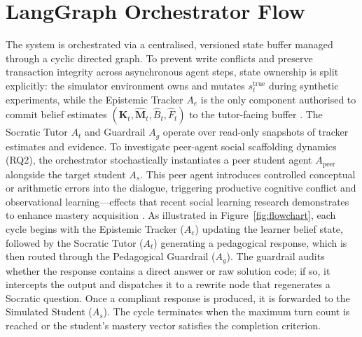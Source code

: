 \documentclass[11pt,a4paper]{report}
\begin{document}
\section{LangGraph Orchestrator Flow}
The system is orchestrated via a centralised, versioned state buffer managed through a cyclic directed graph. To prevent write conflicts and preserve transaction integrity across asynchronous agent steps, state ownership is split explicitly: the simulator environment owns and mutates $s_t^{\text{true}}$ during synthetic experiments, while the Epistemic Tracker $A_e$ is the only component authorised to commit belief estimates $(\hat{\mathbf{K}}_t,\hat{\mathbf{M}}_t,\hat{B}_t,\hat{F}_t)$ to the tutor-facing buffer \cite{intellicode2025,elhaimeur2026itas}. The Socratic Tutor $A_t$ and Guardrail $A_g$ operate over read-only snapshots of tracker estimates and evidence. To investigate peer-agent social scaffolding dynamics (RQ2), the orchestrator stochastically instantiates a peer student agent $A_{\text{peer}}$ alongside the target student $A_s$. This peer agent introduces controlled conceptual or arithmetic errors into the dialogue, triggering productive cognitive conflict and observational learning---effects that recent social learning research demonstrates to enhance mastery acquisition \cite{kumar2026beyond}. As illustrated in Figure~\ref{fig:flowchart}, each cycle begins with the Epistemic Tracker ($A_e$) updating the learner belief state, followed by the Socratic Tutor ($A_t$) generating a pedagogical response, which is then routed through the Pedagogical Guardrail ($A_g$). The guardrail audits whether the response contains a direct answer or raw solution code; if so, it intercepts the output and dispatches it to a rewrite node that regenerates a Socratic question. Once a compliant response is produced, it is forwarded to the Simulated Student ($A_s$). The cycle terminates when the maximum turn count is reached or the student's mastery vector satisfies the completion criterion.
\end{document}
